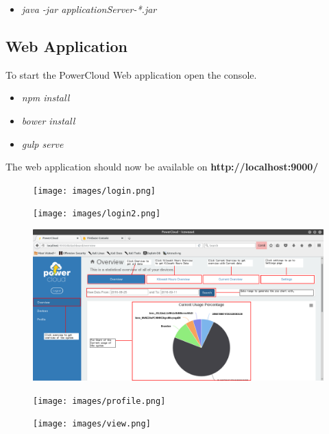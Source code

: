 \documentclass[a4paper,10pt]{article}
\begin{document}
	\begin{itemize}
		\item \textit{java -jar applicationServer-*.jar}
	\end{itemize}
	
	\subsection{Web Application}
	To start the PowerCloud Web application open the console.
	
	\begin{itemize}
		\item \textit{npm install}
		\item \textit{bower install}
		\item \textit{gulp serve}
	\end{itemize}
	
	The web application should now be available on \textbf{http://localhost:9000/}
	
	\begin{figure}[H]
		\texttt{[image: images/login.png]}
	\end{figure}
	
	\begin{figure}[H]
		\texttt{[image: images/login2.png]}
	\end{figure}
	
	\begin{figure}[H]
		\includegraphics[scale=0.3]{images/Overview.png}
	\end{figure}
	
	\begin{figure}[H]
		\texttt{[image: images/profile.png]}
	\end{figure}
	
	\begin{figure}[H]
		\texttt{[image: images/view.png]}
	\end{figure}
	
\end{document}
